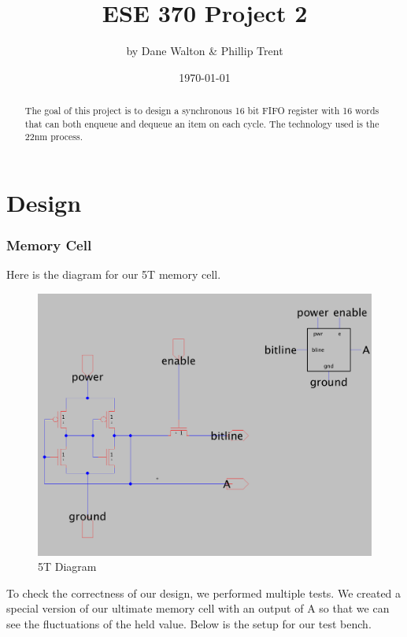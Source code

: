 \documentclass[a4paper]{article}
\title{ESE 370 Project 2}
\author{by Dane Walton \& Phillip Trent}
\date{\today}
\begin{document}
\maketitle

\begin{abstract}
The goal of this project is to design a synchronous 16 bit FIFO register with 16 words that can both enqueue and dequeue an item on each cycle. The technology used is the 22nm process.
\end{abstract}

\section{Design}
\label{sec:design}
\subsubsection{Memory Cell}
Here is the diagram for our 5T memory cell.\\

 \begin{figure}[H]
 	\centering
	 \includegraphics[scale=0.2]{5TCell}
	 \caption{5T Diagram}
	 \label{fig:5TCell}
 \end{figure}
 
To check the correctness of our design, we performed multiple tests. We created a special version of our ultimate memory cell with an output of A so that we can see the fluctuations of the held value. Below is the setup for our test bench.\\
\end{document}

